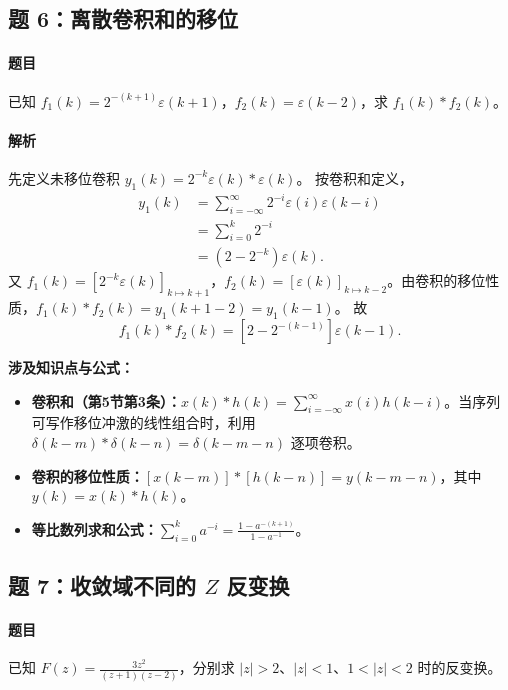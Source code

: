 \documentclass[12pt,a4paper]{ctexart}
\newcommand{\eps}{\varepsilon}
\begin{document}
\subsection{题 6：离散卷积和的移位}
\paragraph{题目}
已知 \(\displaystyle f_1(k)=2^{-(k+1)}\eps(k+1)\)，\(\displaystyle f_2(k)=\eps(k-2)\)，求 $f_1(k)*f_2(k)$。

\paragraph{解析}
先定义未移位卷积 \(\displaystyle y_1(k)=2^{-k}\eps(k)*\eps(k)\)。
按卷积和定义，
\begin{align*}
y_1(k)
&=\sum_{i=-\infty}^{\infty}2^{-i}\eps(i)\eps(k-i)\\
&=\sum_{i=0}^{k}2^{-i}\\
&=\left(2-2^{-k}\right)\eps(k).
\end{align*}
又 \(\displaystyle f_1(k)=\left[2^{-k}\eps(k)\right]_{k\mapsto k+1}\)，\(\displaystyle f_2(k)=\left[\eps(k)\right]_{k\mapsto k-2}\)。由卷积的移位性质，\(\displaystyle f_1(k)*f_2(k)=y_1(k+1-2)=y_1(k-1)\)。
故
\[
\boxed{
f_1(k)*f_2(k)=
\left[2-2^{-(k-1)}\right]\eps(k-1).}
\]

\textbf{涉及知识点与公式：}
\begin{itemize}
    \item \textbf{卷积和（第5节第3条）：}$x(k)*h(k)=\displaystyle\sum_{i=-\infty}^{\infty}x(i)h(k-i)$。当序列可写作移位冲激的线性组合时，利用 $\delta(k-m)*\delta(k-n)=\delta(k-m-n)$ 逐项卷积。
    \item \textbf{卷积的移位性质：}$[x(k-m)]*[h(k-n)]=y(k-m-n)$，其中 $y(k)=x(k)*h(k)$。
    \item \textbf{等比数列求和公式：}$\displaystyle\sum_{i=0}^{k}a^{-i}=\frac{1-a^{-(k+1)}}{1-a^{-1}}$。
\end{itemize}

\subsection{题 7：收敛域不同的 $Z$ 反变换}
\paragraph{题目}
已知 \(\displaystyle F(z)=\frac{3z^2}{(z+1)(z-2)}\)，分别求 $|z|>2$、$|z|<1$、$1<|z|<2$ 时的反变换。
\end{document}
